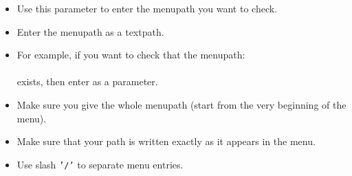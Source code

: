    
\begin{itemize}
\item Use this parameter to enter the menupath you want to check. 
\item Enter the menupath as a textpath.
\item For example, if you want to check that the menupath:\\
\\
exists, then enter  as a parameter.
\item Make sure you give the whole menupath (start from the very beginning of the menu).
\item Make sure that your path is written exactly as it appears in the menu. 
\item Use slash {\tt '/'} to separate menu entries.
\end{itemize}


 